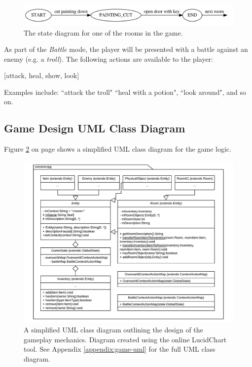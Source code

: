 \documentclass[11pt]{article}
\begin{document}
\begin{center}
\begin{figure}[H]
\begin{center}
  \includegraphics[width=\linewidth]{room1-fsa.pdf}
  \caption{The state diagram for one of the rooms in the game.}
  \label{fig:room1-fsa}
  \end{center}
\end{figure}
\end{center}

As part of the \textit{Battle} mode, the player will be presented with a battle against an enemy (e.g. a \textit{troll}). The following actions are available to the player:

\begin{center}
[attack, heal, show, look]
\end{center}

Examples include: ``attack the troll" ``heal with a potion", ``look around", and so on.

\subsection{Game Design UML Class Diagram}

Figure \ref{fig:game-overview} on page \pageref{fig:game-overview} shows a simplified UML class diagram for the game logic.
\\
\begin{figure}
\begin{center}
  \includegraphics[width=\linewidth]{game-overview.pdf}
  \caption{A simplified UML class diagram outlining the design of the gameplay mechanics. Diagram created using the online LucidChart tool. See Appendix \ref{appendix:game-uml} for the full UML class diagram.}
  \label{fig:game-overview}
  \end{center}
\end{figure}
\end{document}
